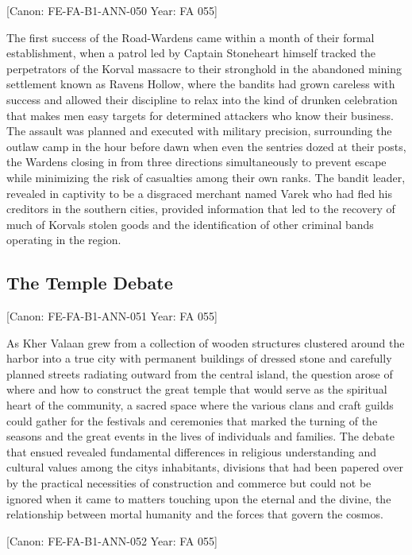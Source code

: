 {[}Canon: FE-FA-B1-ANN-050 \textbar{} Year: FA 055{]}

The first success of the Road-Wardens came within a month of their
formal establishment, when a patrol led by Captain Stoneheart himself
tracked the perpetrators of the Korval massacre to their stronghold in
the abandoned mining settlement known as Raven\textquotesingle s Hollow,
where the bandits had grown careless with success and allowed their
discipline to relax into the kind of drunken celebration that makes men
easy targets for determined attackers who know their business. The
assault was planned and executed with military precision, surrounding
the outlaw camp in the hour before dawn when even the sentries dozed at
their posts, the Wardens closing in from three directions simultaneously
to prevent escape while minimizing the risk of casualties among their
own ranks. The bandit leader, revealed in captivity to be a disgraced
merchant named Varek who had fled his creditors in the southern cities,
provided information that led to the recovery of much of
Korval\textquotesingle s stolen goods and the identification of other
criminal bands operating in the region.

\subsection{The Temple Debate}\label{the-temple-debate}

{[}Canon: FE-FA-B1-ANN-051 \textbar{} Year: FA 055{]}

As Kher Valaan grew from a collection of wooden structures clustered
around the harbor into a true city with permanent buildings of dressed
stone and carefully planned streets radiating outward from the central
island, the question arose of where and how to construct the great
temple that would serve as the spiritual heart of the community, a
sacred space where the various clans and craft guilds could gather for
the festivals and ceremonies that marked the turning of the seasons and
the great events in the lives of individuals and families. The debate
that ensued revealed fundamental differences in religious understanding
and cultural values among the city\textquotesingle s inhabitants,
divisions that had been papered over by the practical necessities of
construction and commerce but could not be ignored when it came to
matters touching upon the eternal and the divine, the relationship
between mortal humanity and the forces that govern the cosmos.

{[}Canon: FE-FA-B1-ANN-052 \textbar{} Year: FA 055{]}

